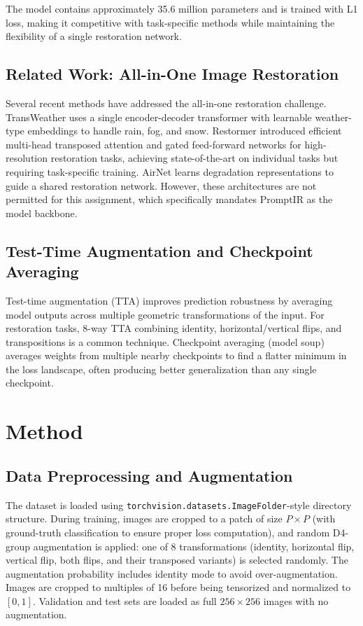 \documentclass[12pt, a4paper]{article}
\begin{document}
The model contains approximately 35.6 million parameters and is trained with L1 loss, making it competitive with task-specific methods while maintaining the flexibility of a single restoration network.

\subsection{Related Work: All-in-One Image Restoration}
Several recent methods have addressed the all-in-one restoration challenge. TransWeather \cite{valanarasu2022} uses a single encoder-decoder transformer with learnable weather-type embeddings to handle rain, fog, and snow. Restormer \cite{zamir2022} introduced efficient multi-head transposed attention and gated feed-forward networks for high-resolution restoration tasks, achieving state-of-the-art on individual tasks but requiring task-specific training. AirNet \cite{li2022} learns degradation representations to guide a shared restoration network. However, these architectures are not permitted for this assignment, which specifically mandates PromptIR as the model backbone.

\subsection{Test-Time Augmentation and Checkpoint Averaging}
Test-time augmentation (TTA) \cite{ashukha2020} improves prediction robustness by averaging model outputs across multiple geometric transformations of the input. For restoration tasks, 8-way TTA combining identity, horizontal/vertical flips, and transpositions is a common technique. Checkpoint averaging (model soup) \cite{wortsman2022} averages weights from multiple nearby checkpoints to find a flatter minimum in the loss landscape, often producing better generalization than any single checkpoint.

\section{Method}

\subsection{Data Preprocessing and Augmentation}
The dataset is loaded using \texttt{torchvision.datasets.ImageFolder}-style directory structure. During training, images are cropped to a patch of size $P \times P$ (with ground-truth classification to ensure proper loss computation), and random D4-group augmentation is applied: one of 8 transformations (identity, horizontal flip, vertical flip, both flips, and their transposed variants) is selected randomly. The augmentation probability includes identity mode to avoid over-augmentation. Images are cropped to multiples of 16 before being tensorized and normalized to $[0, 1]$. Validation and test sets are loaded as full $256 \times 256$ images with no augmentation.
\end{document}
